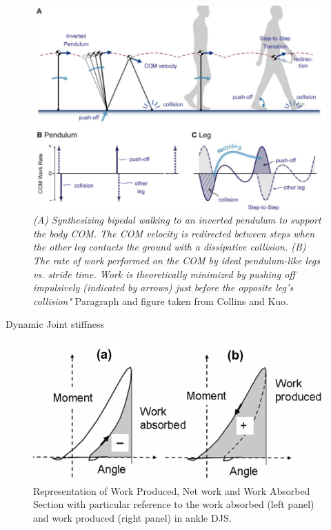 \documentclass[10pt]{beamer}
\begin{document}
\begin{frame}
\begin{figure}[H]
\begin{centering}
\includegraphics[scale=0.3]{RecycledEng}
\par\end{centering}

\caption{\label{fig:(A)-Representaci=0000F3n-de}{\scriptsize \emph{(A) Synthesizing bipedal walking to an inverted pendulum to support the body COM. The COM velocity is redirected between steps when the other leg contacts the ground with a dissipative collision. (B) The rate of work performed on the COM by ideal pendulum-like legs vs. stride time. Work is theoretically minimized by pushing off impulsively (indicated by arrows) just before the opposite leg’s collision" }Paragraph and figure taken from Collins and Kuo\cite{Collins2010}.}}

\end{figure}
\end{frame}

\begin{frame}[fragile]{Dynamic Joint stiffness}
\begin{figure}[h]
\begin{center}
\includegraphics[scale=0.35]{Wproduced.png}
\caption{Representation of Work Produced, Net work and Work Absorbed Section with particular reference to the work absorbed (left panel) and work produced (right panel) in ankle DJS\cite{Crenna2011}.}
\end{center}
\end{figure}
\end{frame}
\end{document}
